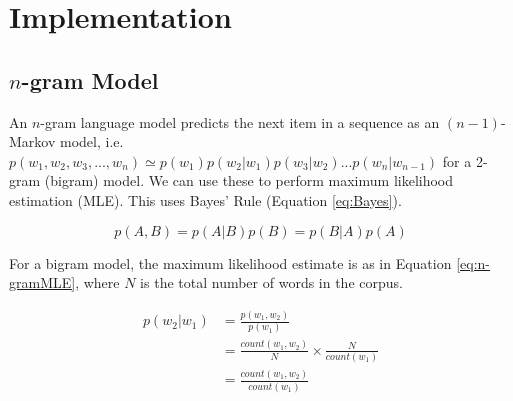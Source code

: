 \chapter{Implementation}

\section{$n$-gram Model}

An $n$-gram language model predicts the next item in a sequence as an $(n-1)$-Markov model, i.e. $p(w_{1}, w_{2}, w_{3}, ..., w_{n})\simeq p(w_{1})p(w_{2}|w_{1})p(w_{3}|w_{2})...p(w_{n}|w_{n-1})$ for a 2-gram (bigram) model. We can use these to perform maximum likelihood estimation (MLE). This uses Bayes' Rule (Equation \ref{eq:Bayes}).%

\begin{equation}
\label{eq:Bayes}
p(A,B)=p(A|B)p(B)=p(B|A)p(A)
\end{equation}




For a bigram model, the maximum likelihood estimate is as in Equation \ref{eq:n-gramMLE}, where $N$ is the total number of words in the corpus.

\begin{subequations}
\begin{align}
p(w_{2}|w_{1})&=\frac{p(w_{1}, w_{2})}{p(w_{1})}
\\
&= \frac{count(w_{1}, w_{2})}{N} \times \frac{N}{count(w_{1})}
\\
&=\frac{count(w_{1}, w_{2})}{count(w_{1})} \label{eq:n-gramMLE}
\end{align}
\end{subequations}

